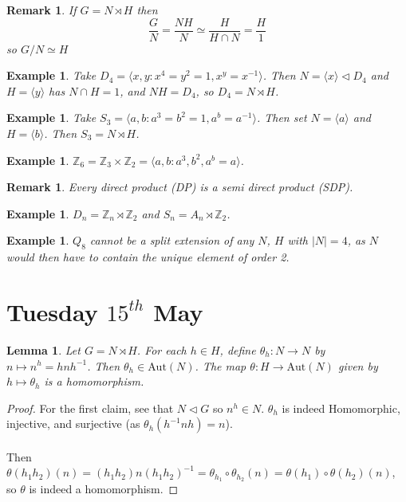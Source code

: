 \documentclass[a4paper,10pt]{article}
\newcommand{\ZZ}{\mathbb{Z}}
\newtheorem{eg}[thm]{Example}
\newtheorem{Lem}[thm]{Lemma}
\newtheorem{rem}[thm]{Remark}
\begin{document}
\begin{rem}
If $G = N \rtimes H$ then
\[ \frac{G}{N} = \frac{NH}{N} \simeq \frac{H}{H \cap N} = \frac{H}{1} \]
so $G / N \simeq H$
\end{rem}


\begin{eg}
Take $D_4 = \langle x,y : x^4 = y^2 = 1, x^y = x^{-1} \rangle$. Then $N = \langle x \rangle  \triangleleft D_4$ and $H = \langle y \rangle$ has $N \cap H = 1$, and $NH = D_4$, so $D_4 = N \rtimes H$.
\end{eg}

\begin{eg}
Take $S_3 = \langle a,b : a^3 = b^2 = 1, a^b = a^{-1} \rangle$. Then set $N = \langle a \rangle$ and $H = \langle b \rangle$. Then $S_3 = N \rtimes H$. 
\end{eg}

\begin{eg}
$\ZZ_6 = \ZZ_3 \times \ZZ_2 = \langle a,b : a^3, b^2, a^b = a \rangle$. 
\end{eg}

\begin{rem}
Every direct product (DP) is a semi direct product (SDP).
\end{rem}

\begin{eg}
$D_n = \ZZ_n \rtimes \ZZ_2$ and $S_n = A_n \rtimes \ZZ_2$. 
\end{eg}

\begin{eg}
$Q_8$ cannot be a split extension of any $N$, $H$ with $|N| = 4$, as $N$ would then have to contain the unique element of order 2.
\end{eg}





\newpage
\section{Tuesday $15^{th}$ May}

\begin{Lem}
Let $G = N \rtimes H$. For each $h \in H$, define $\theta_h : N \rightarrow N$ by $n \mapsto n^h = h n h^{-1}$. Then $\theta_h \in \text{Aut}(N)$. The map $\theta : H \rightarrow \text{Aut}(N)$ given by $h \mapsto \theta_h$ is a homomorphism. 
\end{Lem}

\begin{proof}
For the first claim, see that $N \triangleleft G$ so $n^h \in N$. $\theta_h$ is indeed Homomorphic, injective, and surjective (as $\theta_h(h^{-1} n h) = n$). \\
\\
Then $\theta(h_1 h_2) (n) = (h_1 h_2) n (h_1 h_2)^{-1} = \theta_{h_1} \circ \theta_{h_2} (n) = \theta(h_1) \circ \theta(h_2) (n)$, so $\theta$ is indeed a homomorphism.
\end{proof}
\end{document}
